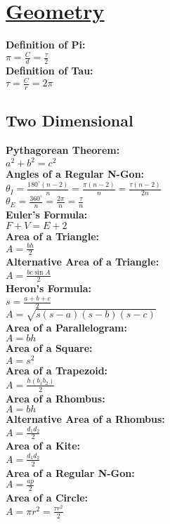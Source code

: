\documentclass[12pt]{article}
\begin{document}
\section*{\underline{Geometry}}
\textbf{Definition of Pi:}
    \\ \( \pi = \displaystyle\frac{ C }{ d } = \displaystyle\frac{ \tau }{ 2 } \)
\\ \textbf{Definition of Tau:}
    \\ \( \tau = \displaystyle\frac{ C }{ r } = 2 \pi \)

\subsection*{Two Dimensional}
\textbf{Pythagorean Theorem:}
    \\ \( a^2 + b^2 = c^2 \)
\\ \textbf{Angles of a Regular N-Gon:}
    \\ \( \theta_I = \displaystyle\frac{ 180^\circ ( n - 2 ) }{ n } = \displaystyle\frac{ \pi ( n - 2 ) }{ n } = \displaystyle\frac{ \tau ( n - 2 ) }{ 2n } \)
    \\ \( \theta_E = \displaystyle\frac{ 360^\circ }{ n } = \displaystyle\frac{ 2 \pi }{ n } = \displaystyle\frac{ \tau }{ n } \)
\\ \textbf{Euler's Formula:}
    \\ \( F + V = E + 2 \)
\\ \textbf{Area of a Triangle:}
    \\ \( A = \displaystyle\frac{ bh }{ 2 } \)
\\ \textbf{Alternative Area of a Triangle:}
    \\ \( A = \displaystyle\frac{ bc \sin A }{ 2 } \)
\\ \textbf{Heron's Formula:}
    \\ \( s = \displaystyle\frac{ a + b + c }{ 2 } \)
    \\ \( A = \sqrt{ s( s - a )( s - b )( s - c ) } \)
\\ \textbf{Area of a Parallelogram:}
    \\ \( A = bh \)
\\ \textbf{Area of a Square:}
    \\ \( A = s^2 \)
\\ \textbf{Area of a Trapezoid:}
    \\ \( A = \displaystyle\frac{ h( b_1 b_2 ) }{ 2 } \)
\\ \textbf{Area of a Rhombus:}
    \\ \( A = bh \)
\\ \textbf{Alternative Area of a Rhombus:}
    \\ \( A = \displaystyle\frac{ d_1 d_2 }{ 2 } \)
\\ \textbf{Area of a Kite:}
    \\ \( A = \displaystyle\frac{ d_1 d_2 }{ 2 } \)
\\ \textbf{Area of a Regular N-Gon:}
    \\ \( A = \displaystyle\frac{ ap }{ 2 } \)
\\ \textbf{Area of a Circle:}
    \\ \( A = \pi r^2 = \displaystyle\frac{ \tau r^2 }{ 2 } \)
\end{document}
